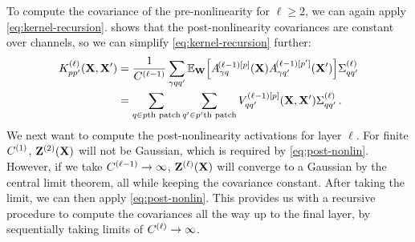 \documentclass[tablecaption=bottom,wcp,nonatbib]{jmlr} %
\newcommand{\vX}{\mathbf{X}}
\newcommand{\vW}{\mathbf{W}}
\begin{document}
To compute the covariance of the pre-nonlinearity for $\ell\geq 2$, we can again apply \cref{eq:kernel-recursion}.  shows that the post-nonlinearity covariances are constant over channels, so we can simplify \cref{eq:kernel-recursion} further:
\begin{align}
    K_{pp'}^{(\ell)}(\vX, \vX') &= \frac{1}{\layerC{\ell-1}} \sum_{\gamma qq'} \Exp{\vW}{\layerNLAs{(\ell-1)[p]}{\gamma q} \layerNLAsd{(\ell-1)[p']}{\gamma q'}} \priorWcovs{\ell}_{qq'} \nonumber \\
    &= \sum_{q \in p\text{th patch}}\sum_{q'\in p'\text{th patch}} V_{qq'}^{(\ell-1)[p]}(\vX,\vX') \priorWcovs{\ell}_{qq'} \,. \label{eq:collected-kernel}
\end{align}
We next want to compute the post-nonlinearity activations for layer $\ell$. For finite $C^{(1)}$, $\layerA{2}{}$ will not be Gaussian, which is required by \cref{eq:post-nonlin}. However, if we take $C^{(\ell-1)}\to\infty$, $\layerA{\ell}{}$ will converge to a Gaussian by the central limit theorem, all while keeping the covariance constant. After taking the limit, we can then apply \cref{eq:post-nonlin}. This provides us with a recursive procedure to compute the covariances all the way up to the final layer, by sequentially taking limits of $C^{(\ell)}\to\infty$. %

\end{document}
